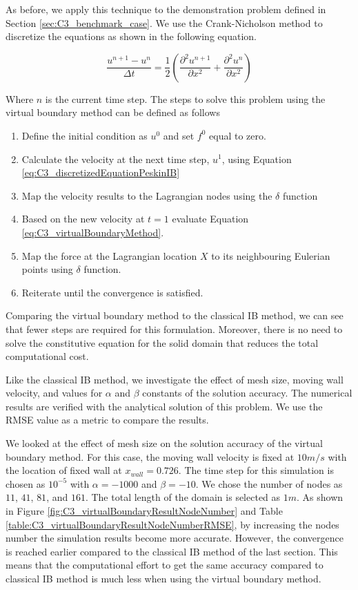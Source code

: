 As before, we apply this technique to the demonstration problem defined in Section \ref{sec:C3_benchmark_case}. We use the Crank-Nicholson method to discretize the equations as shown in the following equation. 

\begin{equation}\label{eq:C3_virtualBoundaryDiscretization}
    \frac{u^{n+1} - u^n}{\Delta t} = 
    \frac{1}{2}
    \left(
    \frac{\partial^2 u^{n+1}}{\partial x^2} +
    \frac{\partial^2 u^{n}}{\partial x^2}
    \right)
\end{equation}

Where $n$ is the current time step. The steps to solve this problem using the virtual boundary method can be defined as follows

\begin{enumerate}
    \item Define the initial condition as $u^0$ and set $f^0$ equal to zero.
    \item Calculate the velocity at the next time step, $u^1$, using Equation \eqref{eq:C3_discretizedEquationPeskinIB}
    \item Map the velocity results to the Lagrangian nodes using the $\delta$ function
    \item Based on the new velocity at $t=1$ evaluate Equation \eqref{eq:C3_virtualBoundaryMethod}.
    \item Map the force at the Lagrangian location $X$ to its neighbouring Eulerian points using $\delta$ function.
    \item Reiterate until the convergence is satisfied.
\end{enumerate}

Comparing the virtual boundary method to the classical IB method, we can see that fewer steps are required for this formulation. Moreover, there is no need to solve the constitutive equation for the solid domain that reduces the total computational cost.

Like the classical IB method, we investigate the effect of mesh size, moving wall velocity, and values for $\alpha$ and $\beta$ constants of the solution accuracy. The numerical results are verified with the analytical solution of this problem. We use the RMSE value as a metric to compare the results.

We looked at the effect of mesh size on the solution accuracy of the virtual boundary method. For this case, the moving wall velocity is fixed at $10 m/s$ with the location of fixed wall at $x_{wall} = 0.726$. The time step for this simulation is chosen as $10^{-5}$ with $\alpha = -1000$ and $\beta = -10$. We chose the number of nodes as $11$, $41$, $81$, and $161$. The total length of the domain is selected as $1 m$. As shown in Figure \ref{fig:C3_virtualBoundaryResultNodeNumber} and Table \ref{table:C3_virtualBoundaryResultNodeNumberRMSE}, by increasing the nodes number the simulation results become more accurate. However, the convergence is reached earlier compared to the classical IB method of the last section. This means that the computational effort to get the same accuracy compared to classical IB method is much less when using the virtual boundary method. 

